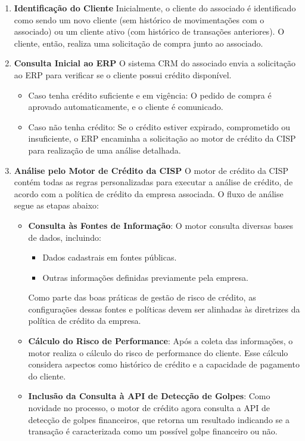 \documentclass[12pt,a4paper]{article}
\begin{document}
\begin{enumerate}
    \item \textbf{Identifica\c{c}\~{a}o do Cliente}
    Inicialmente, o cliente do associado \'{e} identificado como sendo um novo cliente (sem hist\'orico de movimenta\c{c}\~{o}es com o associado) ou um cliente ativo (com hist\'orico de transa\c{c}\~{o}es anteriores). O cliente, ent\~{a}o, realiza uma solicita\c{c}\~{a}o de compra junto ao associado.

    \item \textbf{Consulta Inicial ao ERP}
    O sistema CRM do associado envia a solicita\c{c}\~{a}o ao ERP para verificar se o cliente possui cr\'edito dispon\'ivel.
    \begin{itemize}
        \item Caso tenha cr\'edito suficiente e em vig\^{e}ncia: O pedido de compra \'{e} aprovado automaticamente, e o cliente \'{e} comunicado.
        \item Caso n\~{a}o tenha cr\'edito: Se o cr\'edito estiver expirado, comprometido ou insuficiente, o ERP encaminha a solicita\c{c}\~{a}o ao motor de cr\'edito da CISP para realiza\c{c}\~{a}o de uma an\'alise detalhada.
    \end{itemize}

    \item \textbf{An\'alise pelo Motor de Cr\'edito da CISP}
    O motor de cr\'edito da CISP cont\'em todas as regras personalizadas para executar a an\'alise de cr\'edito, de acordo com a pol\'itica de cr\'edito da empresa associada. O fluxo de an\'alise segue as etapas abaixo:
    \begin{itemize}
        \item \textbf{Consulta \`as Fontes de Informa\c{c}\~{a}o}: O motor consulta diversas bases de dados, incluindo:
        \begin{itemize}
            \item Dados cadastrais em fontes p\'ublicas.
            \item Outras informa\c{c}\~{o}es definidas previamente pela empresa.
        \end{itemize}
        Como parte das boas pr\'aticas de gest\~{a}o de risco de cr\'edito, as configura\c{c}\~{o}es dessas fontes e pol\'iticas devem ser alinhadas \`as diretrizes da pol\'itica de cr\'edito da empresa.
        \item \textbf{C\'alculo do Risco de Performance}: Ap\'os a coleta das informa\c{c}\~{o}es, o motor realiza o c\'alculo do risco de performance do cliente. Esse c\'alculo considera aspectos como hist\'orico de cr\'edito e a capacidade de pagamento do cliente.
        \item \textbf{Inclus\~{a}o da Consulta \`a API de Detec\c{c}\~{a}o de Golpes}: Como novidade no processo, o motor de cr\'edito agora consulta a API de detec\c{c}\~{a}o de golpes financeiros, que retorna um resultado indicando se a transa\c{c}\~{a}o \'{e} caracterizada como um poss\'ivel golpe financeiro ou n\~{a}o.
    \end{itemize}


\end{enumerate}
\end{document}
